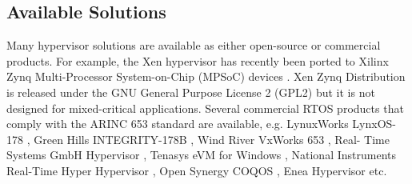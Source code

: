 
\subsection{Available Solutions}
Many hypervisor solutions are available as either open-source or commercial products. For example, the Xen hypervisor has recently been ported to Xilinx Zynq Multi-Processor System-on-Chip (MPSoC) devices \cite{xenZynq}. Xen Zynq Distribution is released under the GNU General Purpose License 2 (GPL2) but it is not designed for mixed-critical applications. Several commercial RTOS products that comply with the ARINC 653 standard \cite{embeddedvmstate} are available, e.g. LynuxWorks LynxOS-178 \cite{LynxOS}, Green Hills INTEGRITY-178B \cite{INTEGRITY178B}, Wind River VxWorks 653 \cite{VxWorks}, Real- Time Systems GmbH Hypervisor \cite{RTGmbH}, Tenasys eVM for Windows \cite{eVM}, National Instruments Real-Time Hyper Hypervisor \cite{NIHypervisor}, Open Synergy COQOS \cite{COQOS}, Enea Hypervisor \cite{EneaHypervisor} etc. 

